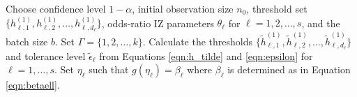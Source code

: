 \documentclass[11pt]{article}
\begin{document}
\begin{algorithm}[h!]
	\caption{Procedure $\mathcal{RF}$ for subjective probability constraints}\label{alg:rf}
{\fontsize{10}{14}\selectfont	
\begin{algorithmic}
	\State [{\bf Setup}:]  Choose confidence level $1-\alpha$, initial observation size $n_0$, threshold set $\{h_{\ell,1}^{(1)}, h_{\ell,2}^{(1)}, \ldots, h_{\ell, d_\ell}^{(1)}\}$, odds-ratio IZ parameters $\theta_\ell$ for $\ell=1,2,\ldots,s$, and the batch size $b$. Set $\Gamma =\{1,2,\ldots,k\}$. 
    Calculate the thresholds $\{\tilde{h}_{\ell,1}^{(1)},\tilde{h}_{\ell,2}^{(1)},\ldots,\tilde{h}_{\ell,d_\ell}^{(1)}\}$ and tolerance level $\tilde{\epsilon}_\ell$ from Equations \eqref{eqn:h_tilde} and \eqref{eqn:epsilon} for $\ell=1,\ldots,s$. Set $\eta_\ell$ such that $g(\eta_\ell) = \beta_\ell$
    where $\beta_\ell$ is determined as in Equation \eqref{eqn:betaell}.


\end{algorithmic}}
\end{algorithm}
\end{document}
